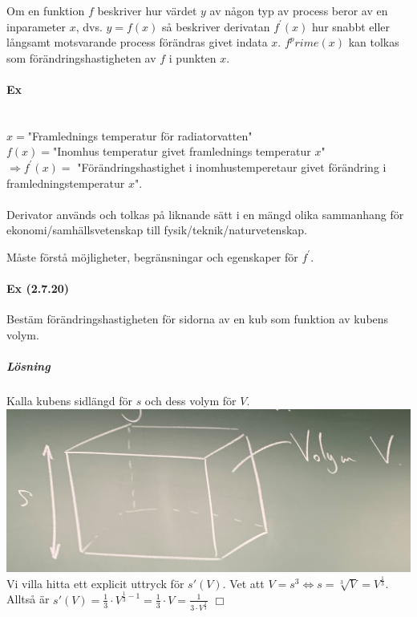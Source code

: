 Om en funktion $f$ beskriver hur värdet $y$ av någon typ av process beror av en inparameter $x$,
dvs. $y=f(x)$ så beskriver derivatan $f^\prime(x)$ hur snabbt eller långsamt motsvarande process förändras givet indata $x$.
$f^prime(x)$ kan tolkas som förändringshastigheten av $f$ i punkten $x$.

\paragraph{Ex}~\\
$x=$"Framlednings temperatur för radiatorvatten"\\
$f(x)=$"Inomhus temperatur givet framlednings temperatur $x$"\\
$\Rightarrow f^\prime(x)=$ "Förändringshastighet i inomhustemperetaur givet förändring i framledningstemperatur $x$".\\
\\Derivator används och tolkas på liknande sätt i en mängd olika sammanhang för ekonomi/samhällsvetenskap till fysik/teknik/naturvetenskap.

Måste förstå möjligheter, begränsningar och egenskaper för $f^\prime$.

\paragraph{Ex (2.7.20)} Bestäm förändringshastigheten för sidorna av en kub som funktion av kubens volym.
\subparagraph{Lösning} Kalla kubens sidlängd för $s$ och dess volym för $V$.\\
\includegraphics[scale=0.1]{lessons/lesson07/imgs/img01.jpg}\\
Vi villa hitta ett explicit uttryck för $s'(V)$.
Vet att $V=s^3\Leftrightarrow s=\sqrt[3]{V}=V^\frac{1}{3}$.
Alltså är $s'(V)=\frac{1}{3}\cdot V^{\frac{1}{3}-1}=\frac{1}{3}\cdot V=\frac{1}{3\cdot V^{\frac{2}{3}}}$ $\Box$

